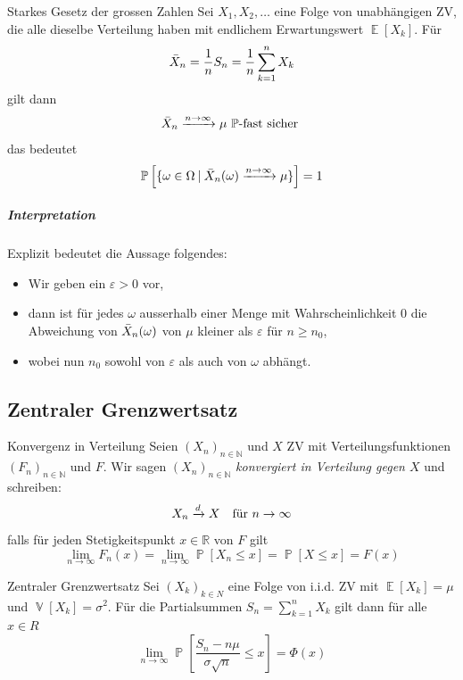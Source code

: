 \documentclass[a4paper,10pt]{article}
\def\N{\mathbb{N}}
\def\R{\mathbb{R}}
\renewcommand{\P}{\operatorname{\mathbb{P}}}
\DeclareMathOperator{\E}{\mathbb{E}}
\DeclareMathOperator{\V}{\mathbb{V}}
\DeclareMathOperator{\normal}{\mathcal{N}}
\numberwithin{equation}{section}
\begin{document}
\begin{mainbox}{Starkes Gesetz der grossen Zahlen}
    Sei \( X_1, X_2, \dots \) eine Folge von unabhängigen ZV, die alle dieselbe Verteilung haben mit endlichem Erwartungswert \( \E[X_k] \). Für
    \[
        \Bar{X}_n = \frac{1}{n} S_n = \frac{1}{n} \sum_{k = 1}^n X_k
    \]
    gilt dann
    \[
        \Bar{X}_n \xrightarrow{n \to \infty} \mu \ \text{\( \P \)-fast sicher }
    \]
    das bedeutet
    \[
        \P\left[\{\omega \in \Omega \: | \: \Bar{X}_n(\omega) \xrightarrow{n \to \infty} \mu\}\right] = 1
    \]
\end{mainbox}

\subparagraph{Interpretation} Explizit bedeutet die Aussage folgendes:
\begin{itemize}
    \item Wir geben ein \( \varepsilon > 0 \) vor,
    \item dann ist für jedes \( \omega \) ausserhalb einer Menge mit Wahrscheinlichkeit 0 die Abweichung von \( \Bar{X}_n(\omega) \) von \( \mu \) kleiner als \( \varepsilon \) für \( n \geq n_0 \),
    \item wobei nun \( n_0 \) sowohl von \( \varepsilon \) als auch von \( \omega \) abhängt.
\end{itemize}

\subsection{Zentraler Grenzwertsatz}

\begin{mainbox}{Konvergenz in Verteilung} \label{box:konvergenz_in_verteilung}
    Seien \( (X_n)_{n \in \N} \) und \( X \) ZV mit Verteilungsfunktionen \( (F_n)_{n \in \N} \) und \( F \). Wir sagen \( (X_n)_{n \in \N} \) \emph{konvergiert in Verteilung gegen \( X \)} und schreiben:
    \[
        X_n \xrightarrow{d} X \quad \text{für \( n \to \infty\)}
    \]
    falls für jeden Stetigkeitspunkt \( x \in \R \) von \( F \) gilt
    \[
        \lim_{n \to \infty} F_n(x) = \lim_{n \to \infty} \P[X_n \leq x] = \P[X \leq x] = F(x)
    \]
\end{mainbox}

\begin{mainbox}{Zentraler Grenzwertsatz}
    Sei \( (X_k)_{k \in N} \) eine Folge von i.i.d. ZV mit \( \E[X_k] = \mu \) und \( \V[X_k] = \sigma^2 \). Für die Partialsummen \( S_n = \sum_{k = 1}^n X_k \) gilt dann für alle \( x \in R \)
    \[
        \lim_{n \to \infty} \P\left[ \frac{S_n - n \mu}{\sigma \sqrt{n}} \leq x \right] = \Phi(x)
    \]
\end{mainbox}
\end{document}
